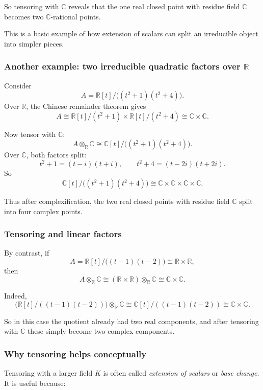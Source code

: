 \documentclass[12pt,a4paper]{article}
\theoremstyle{notespace}
\theoremstyle{definition}
\begin{document}
So tensoring with \(\mathbb{C}\) reveals that the one real closed point with residue field \(\mathbb{C}\) becomes two \(\mathbb{C}\)-rational points.

This is a basic example of how extension of scalars can split an irreducible object into simpler pieces.

\subsubsection{Another example: two irreducible quadratic factors over \(\mathbb{R}\)}

Consider
\[
A=\mathbb{R}[t]/\bigl((t^2+1)(t^2+4)\bigr).
\]
Over \(\mathbb{R}\), the Chinese remainder theorem gives
\[
A
\cong
\mathbb{R}[t]/(t^2+1)\times \mathbb{R}[t]/(t^2+4)
\cong
\mathbb{C}\times \mathbb{C}.
\]

Now tensor with \(\mathbb{C}\):
\[
A\otimes_{\mathbb{R}}\mathbb{C}
\cong
\mathbb{C}[t]/\bigl((t^2+1)(t^2+4)\bigr).
\]
Over \(\mathbb{C}\), both factors split:
\[
t^2+1=(t-i)(t+i),
\qquad
t^2+4=(t-2i)(t+2i).
\]
So
\[
\mathbb{C}[t]/\bigl((t^2+1)(t^2+4)\bigr)
\cong
\mathbb{C}\times \mathbb{C}\times \mathbb{C}\times \mathbb{C}.
\]

Thus after complexification, the two real closed points with residue field \(\mathbb{C}\) split into four complex points.

\subsubsection{Tensoring and linear factors}

By contrast, if
\[
A=\mathbb{R}[t]/\bigl((t-1)(t-2)\bigr)\cong \mathbb{R}\times \mathbb{R},
\]
then
\[
A\otimes_{\mathbb{R}}\mathbb{C}
\cong
(\mathbb{R}\times \mathbb{R})\otimes_{\mathbb{R}}\mathbb{C}
\cong
\mathbb{C}\times \mathbb{C}.
\]

Indeed,
\[
\bigl(\mathbb{R}[t]/((t-1)(t-2))\bigr)\otimes_{\mathbb{R}}\mathbb{C}
\cong
\mathbb{C}[t]/((t-1)(t-2))
\cong
\mathbb{C}\times \mathbb{C}.
\]

So in this case the quotient already had two real components, and after tensoring with \(\mathbb{C}\) these simply become two complex components.

\subsubsection{Why tensoring helps conceptually}

Tensoring with a larger field \(K\) is often called \emph{extension of scalars} or \emph{base change}.  
It is useful because:
\end{document}
